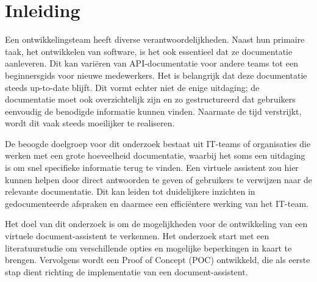 


% 

\section{Inleiding}%
\label{sec:inleiding}

Een ontwikkelingsteam heeft diverse verantwoordelijkheden. Naast hun primaire taak, het ontwikkelen van software, is het ook essentieel dat ze documentatie aanleveren. Dit kan variëren van API-documentatie voor andere teams tot een beginnersgids voor nieuwe medewerkers. Het is belangrijk dat deze documentatie steeds up-to-date blijft. Dit vormt echter niet de enige uitdaging; de documentatie moet ook overzichtelijk zijn en zo gestructureerd dat gebruikers eenvoudig de benodigde informatie kunnen vinden. Naarmate de tijd verstrijkt, wordt dit vaak steeds moeilijker te realiseren.

De beoogde doelgroep voor dit onderzoek bestaat uit IT-teams of organisaties die werken met een grote hoeveelheid documentatie, waarbij het soms een uitdaging is om snel specifieke informatie terug te vinden. Een virtuele assistent zou hier kunnen helpen door direct antwoorden te geven of gebruikers te verwijzen naar de relevante documentatie. Dit kan leiden tot duidelijkere inzichten in gedocumenteerde afspraken en daarmee een efficiëntere werking van het IT-team.

Het doel van dit onderzoek is om de mogelijkheden voor de ontwikkeling van een virtuele document-assistent te verkennen. Het onderzoek start met een literatuurstudie om verschillende opties en mogelijke beperkingen in kaart te brengen. Vervolgens wordt een Proof of Concept (POC) ontwikkeld, die als eerste stap dient richting de implementatie van een document-assistent.

